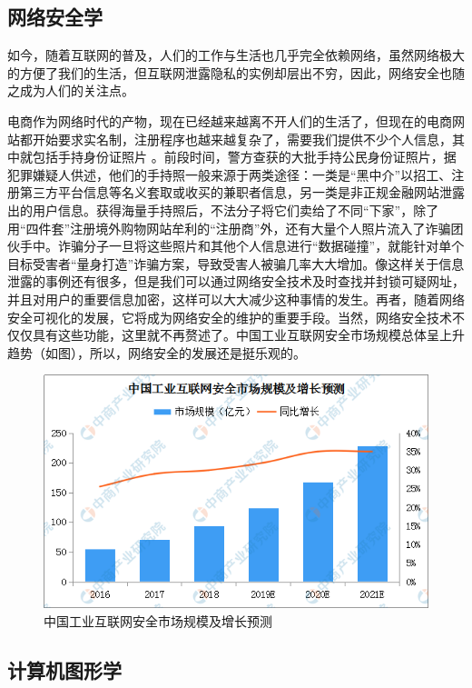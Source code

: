\documentclass{article}
\begin{document}
\subsection{网络安全学}\par
如今，随着互联网的普及，人们的工作与生活也几乎完全依赖网络，虽然网络极大的方便了我们的生活，但互联网泄露隐私的实例却层出不穷，因此，网络安全也随之成为人们的关注点。\par
电商作为网络时代的产物，现在已经越来越离不开人们的生活了，但现在的电商网站都开始要求实名制，注册程序也越来越复杂了，需要我们提供不少个人信息，其中就包括手持身份证照片 。前段时间，警方查获的大批手持公民身份证照片，据犯罪嫌疑人供述，他们的手持照一般来源于两类途径：一类是“黑中介”以招工、注册第三方平台信息等名义套取或收买的兼职者信息，另一类是非正规金融网站泄露出的用户信息。获得海量手持照后，不法分子将它们卖给了不同“下家”，除了用“四件套”注册境外购物网站牟利的“注册商”外，还有大量个人照片流入了诈骗团伙手中。诈骗分子一旦将这些照片和其他个人信息进行“数据碰撞”，就能针对单个目标受害者“量身打造”诈骗方案，导致受害人被骗几率大大增加。像这样关于信息泄露的事例还有很多，但是我们可以通过网络安全技术及时查找并封锁可疑网址，并且对用户的重要信息加密，这样可以大大减少这种事情的发生。再者，随着网络安全可视化\citep{li2019analysis}的发展，它将成为网络安全的维护的重要手段。当然，网络安全技术不仅仅具有这些功能，这里就不再赘述了。中国工业互联网安全市场规模总体呈上升趋势（如图），所以，网络安全的发展还是挺乐观的。
\begin{figure}[h!]
\centering
\includegraphics[scale=0.5]{zghlw}
\caption{中国工业互联网安全市场规模及增长预测}
\end{figure}


\subsection{计算机图形学}\par
\end{document}
